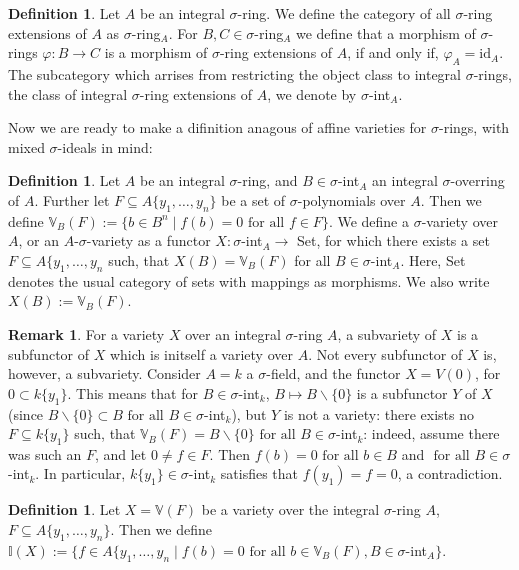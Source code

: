 \documentclass{article}
\def\I{\mathbb{I}}
\def\VV{\mathbb{V}}
\def\s{\sigma}
\def\id{\text{id}}
\def\fa{\text{ for all }}
\theoremstyle{definition}
\newtheorem{rem}[Satz]{Remark}
\newtheorem{defn}[Satz]{Definition}
\begin{document}
\begin{defn}
Let $A$ be an integral $\s$-ring. We define the category of all $\s$-ring extensions of $A$ as $\s$-ring$_A$.
For $B,C \in \s$-ring$_A$ we define that a morphism of $\s$-rings $\varphi: B \rightarrow C$ is a morphism of $\s$-ring extensions of $A$, if and only if, $\varphi_A = \id_A$.
The subcategory which arrises from restricting the object class to integral $\s$-rings, the class of integral $\s$-ring extensions of $A$, we denote by $\s$-int$_A$.
\end{defn}

Now we are ready to make a difinition anagous of affine varieties for $\s$-rings, with mixed $\s$-ideals in mind:

\begin{defn}
Let $A$ be an integral $\s$-ring, and $B \in \s$-int$_A$ an integral $\s$-overring of $A$. Further let $F \subseteq A\{y_1, \ldots, y_n\}$ be a set of $\s$-polynomials over $A$. 
Then we define $\VV_B(F):= \{ b \in B^n \mid f(b) = 0 \fa f \in F \}$. We define a $\s$-variety over $A$, or an $A$-$\s$-variety as a functor $X: \s$-int$_A \rightarrow$ Set, for which there exists a set $F \subseteq A\{y_1, \ldots, y_n$ such, that $X(B) = \VV_B(F)$ for all $B \in \s$-int$_A$.
Here, Set denotes the usual category of sets with mappings as morphisms. We also write $X(B) := \VV_B(F)$. \index{$\s$-variety}
\end{defn}

\begin{rem}
For a variety $X$ over an integral $\s$-ring $A$, a subvariety of $X$ is a subfunctor of $X$ which is initself a variety over $A$. Not every subfunctor of $X$ is, however, a subvariety. Consider $A = k$ a $\s$-field,
and the functor $X = V(0)$, for $0 \subset k\{y_1\}$. This means that for $B \in \s$-int$_k$, $B \mapsto B\backslash \{0\}$ is a subfunctor $Y$ of $X$ (since $B \backslash \{ 0 \} \subset B \fa B \in \s$-int$_k$), but $Y$ is not a variety:
there exists no $F \subseteq k\{y_1\}$ such, that $\VV_B(F) = B \backslash \{ 0 \} \fa B \in \s$-int$_k$: indeed, assume there was such an $F$, and let $0 \neq f \in F$. Then $f(b) = 0 \fa b \in B$ and $\fa B \in \s$-int$_k$. In particular,
$k\{y_1\} \in \s$-int$_k$ satisfies that $f(y_1) = f = 0$, a contradiction. 
\end{rem}

\begin{defn}
Let $X = \VV(F)$ be a variety over the integral $\s$-ring $A$, $F \subseteq A\{y_1,\ldots,y_n\}$. Then we define $\I(X):= \{ f \in A\{y_1,\ldots,y_n \mid f(b) = 0 \fa b \in \VV_B(F), B \in \s$-int$_A \}$.
\end{defn}
\end{document}
